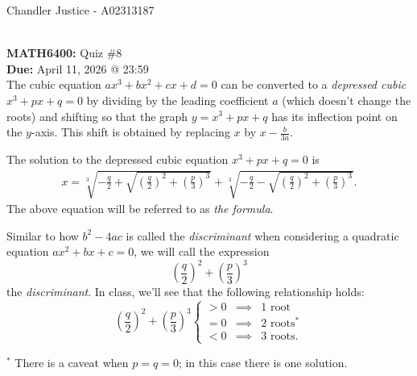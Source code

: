 \documentclass[10pt]{article}
\begin{document}
\begin{flushright}
Chandler Justice - A02313187
\end{flushright}
\noindent \underline{\hspace{3in}}\\
\textbf{MATH6400:} Quiz \#8\\
\textbf{Due:} April 11, 2026 @ 23:59\\


	\noindent The cubic equation $ax^3+bx^2+cx+d=0$ can be converted to a \emph{depressed cubic} $x^3+px + q =0$ by dividing by the leading coefficient $a$ (which doesn't change the roots) and shifting so that the graph $y = x^3+px+q$ has its inflection point on the $y$-axis.  
	This shift is obtained by replacing $x$ by $x - \frac{b}{3a}$. 
	
	The solution to the depressed cubic equation $x^3+px+q =0$ is
	\begin{eqnarray} x = \sqrt[3]{-\frac{q}{2}+\sqrt{\left(\frac{q}{2}\right)^2+\left(\frac{p}{3}\right)^3}} + \sqrt[3]{-\frac{q}{2}-\sqrt{\left(\frac{q}{2}\right)^2+\left(\frac{p}{3}\right)^3}}.\label{The formula}\end{eqnarray}
	The above equation will be referred to as \emph{the formula}.
	
	Similar to how $b^2 - 4ac$ is called the \emph{discriminant} when considering 
	a quadratic equation $ax^2+bx+c=0$, we will call the expression 
	$$\left(\frac{q}{2}\right)^2+\left(\frac{p}{3}\right)^3$$
	the \emph{discriminant}.  
	In class, we'll see that the following relationship holds: 
	$$\left(\frac{q}{2}\right)^2+\left(\frac{p}{3}\right)^3 \left\{\begin{array}{ccl} >0 & \implies & \mbox{$1$ root} \\ = 0 & \implies & \mbox{$2$ roots$^*$} \\
		<0 & \implies & \mbox{$3$ roots.}\end{array} \right .$$
	
	\noindent $^*$ There is a caveat when $p = q = 0$; in this case there is one solution.  
	
\end{document}

